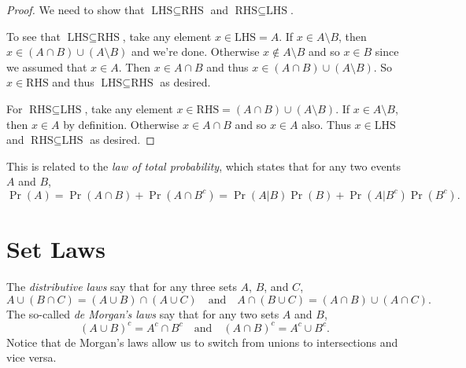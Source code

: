 \begin{proof}
  We need to show that $\text{LHS} \subseteq \text{RHS}$
  and $\text{RHS} \subseteq \text{LHS}$.

  To see that $\text{LHS} \subseteq \text{RHS}$,
  take any element $x \in \text{LHS} = A$. If
  $x \in A \setminus B$, then
  $x \in (A \cap B) \cup (A \setminus B)$ and we're done.
  Otherwise $x \notin A \setminus B$ and so
  $x \in B$ since we assumed that $x \in A$.
  Then $x \in A \cap B$ and thus
  $x \in (A \cap B) \cup (A \setminus B)$. So
  $x \in \text{RHS}$ and thus
  $\text{LHS} \subseteq \text{RHS}$
  as desired.

  For $\text{RHS} \subseteq \text{LHS}$,
  take any element $x \in \text{RHS} = (A \cap B) \cup (A \setminus B)$.
  If $x \in A \setminus B$, then $x \in A$ by definition.
  Otherwise $x \in A \cap B$ and so $x \in A$ also.
  Thus $x \in \text{LHS}$ and $\text{RHS} \subseteq \text{LHS}$ as desired.
\end{proof}

\begin{remark}
  This is related to the \emph{law of
  total probability}, which states that
  for any two events $A$ and $B$,
  \[
    \Pr(A)
    = \Pr(A \cap B) + \Pr(A \cap B^c)
    = \Pr(A | B)\Pr(B) + \Pr(A | B^c)\Pr(B^c).
  \]
\end{remark}

\section{Set Laws}
The \emph{distributive laws} say that
for any three sets $A$, $B$, and $C$,
\[
  A \cup (B \cap C) = (A \cup B) \cap (A \cup C)
  \quad \text{and} \quad
  A \cap (B \cup C) = (A \cap B) \cup (A \cap C).
\]
The so-called \emph{de Morgan's laws} say that
for any two sets $A$ and $B$,
\[
  (A \cup B)^c = A^c \cap B^c
  \quad \text{and} \quad
  (A \cap B)^c = A^c \cup B^c.
\]
Notice that de Morgan's laws allow us to switch
from unions to intersections and vice versa.
